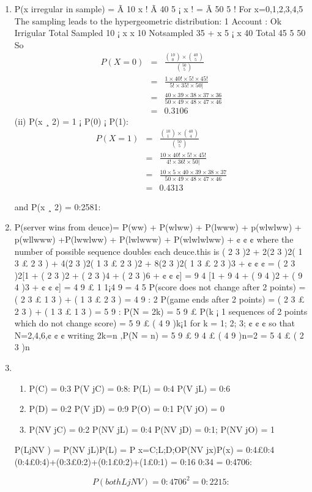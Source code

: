\documentclass[a4paper,12pt]{article}
\begin{document}
\begin{enumerate}
\item P(x irregular in sample) =
Ã
10
x
! Ã
40
5 ¡ x
!
=
Ã
50
5
!
For x=0,1,2,3,4,5
The sampling leads to the hypergeometric distribution:
1
Account : Ok Irrigular Total
Sampled 10 ¡ x x 10
Notsampled 35 + x 5 ¡ x 40
Total 45 5 50
So
\begin{eqnarray*}
P(X=0) &=& \frac{ {10 \choose 0} \times {40 \choose 5} }{ {50 \choose 5}}\\
&=& \frac{1 \times 40! \times 5!  \times 45!}{5! \times 35! \times 50|}\\
&=& \frac{ 40 \times 39 \times 38 \times 37 \times 36}{50 \times 49 \times 48 \times 47 \times 46}\\
&=& 0.3106
\end{eqnarray*}
(ii)
P(x ¸ 2) = 1 ¡ P(0) ¡ P(1):
\begin{eqnarray*}
P(X=1) &=& \frac{ {10 \choose 1} \times {40 \choose 4} }{ {50 \choose 5}}\\
&=& \frac{10 \times 40! \times 5!  \times 45!}{4! \times 36! \times 50|}\\
&=& \frac{10 \times 5 \times 40 \times 39 \times 38 \times 37}{50 \times 49 \times 48 \times 47 \times 46}\\
&=& 0.4313
\end{eqnarray*}


and P(x ¸ 2) = 0:2581:
\item P(server wins from deuce)=
P(ww) + P(wlww) + P(lwww) + p(wlwlww) + p(wllwww)
+P(lwwlww) + P(lwlwww) + P(wlwlwlww) + ¢ ¢ ¢
where the number of possible sequence doubles each deuce.this is
( 2
3 )2 + 2(2
3 )2( 1
3 £ 2
3 ) + 4(2
3 )2( 1
3 £ 2
3 )2 + 8(2
3 )2( 1
3 £ 2
3 )3 + ¢ ¢ ¢
= ( 2
3 )2[1 + ( 2
3 )2 + ( 2
3 )4 + ( 2
3 )6 + ¢ ¢ ¢]
= 9
4 [1 + 9
4 + ( 9
4 )2 + ( 9
4 )3 + ¢ ¢ ¢] = 4
9 £ 1
1¡4
9
= 4
5
P(score does not change after 2 points) = ( 2
3 £ 1
3 ) + ( 1
3 £ 2
3 ) = 4
9 :
2
P(game ends after 2 points) = ( 2
3 £ 2
3 ) + ( 1
3 £ 1
3 ) = 5
9 :
P(N = 2k) = 5
9 £ P(k ¡ 1 sequences of 2 points which do not change score)
= 5
9 £ ( 4
9 )k¡1 for k = 1; 2; 3; ¢ ¢ ¢
so that N=2,4,6,¢ ¢ ¢
writing 2k=n ,P(N = n) = 5
9 £ 9
4 £ ( 4
9 )n=2 = 5
4 £ ( 2
3 )n
\item

\begin{enumerate}
    \item P(C) = 0:3 P(V jC) = 0:8: P(L) = 0:4 P(V jL) = 0:6
    \item P(D) = 0:2 P(V jD) = 0:9 P(O) = 0:1 P(V jO) = 0
    \item P(NV jC) = 0:2 P(NV jL) = 0:4 P(NV jD) = 0:1; P(NV jO) = 1
\end{enumerate}

P(LjNV ) = P(NV jL)P(L) =
P
x=C;L;D;OP(NV jx)P(x)
= 0:4£0:4
(0:4£0:4)+(0:3£0:2)+(0:1£0:2)+(1£0:1) = 0:16
0:34 = 0:4706:

\[P(both LjNV ) = 0:4706^2 = 0:2215:\]

\end{enumerate}
\end{document}
